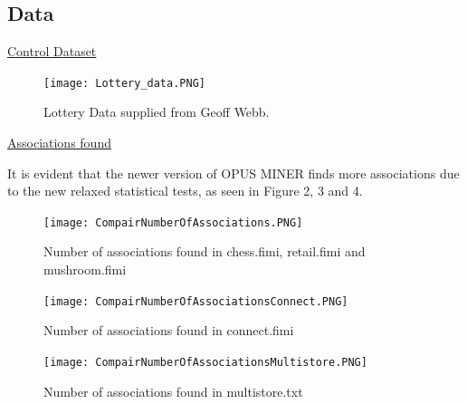 \documentclass[10pt,a4paper]{article}
\begin{document}
\subsection{Data}

\vspace{0.5cm}

\underline{Control Dataset}
\vspace{0.3cm}


\begin{figure}[h!]
\begin{center}
  \texttt{[image: Lottery\_data.PNG]}
\end{center}
  \caption{Lottery Data supplied from Geoff Webb.}
  \label{fig:SSPresults1}
\end{figure}



\pagebreak

\vspace{2cm}
\underline{Associations found}
\vspace{0.3cm}
\begin{addmargin}[3em]{1em}
It is evident that the newer version of OPUS MINER finds more associations due to the new relaxed statistical tests, as seen in Figure 2, 3 and 4.
\end{addmargin}

\vspace{1cm}

\begin{figure}[h!]
\begin{center}
  \texttt{[image: CompairNumberOfAssociations.PNG]}
\end{center}
  \caption{Number of associations found in chess.fimi, retail.fimi and mushroom.fimi}
  \label{fig:SSPresults1}
\end{figure}

\vspace{2cm}

\begin{figure}[h!]
\begin{center}
  \texttt{[image: CompairNumberOfAssociationsConnect.PNG]}
\end{center}
  \caption{Number of associations found in connect.fimi}
  \label{fig:SSPresults1}
\end{figure}

\vspace{2cm}

\begin{figure}[h!]
\begin{center}
  \texttt{[image: CompairNumberOfAssociationsMultistore.PNG]}
\end{center}
  \caption{Number of associations found in multistore.txt}
  \label{fig:SSPresults1}
\end{figure}
\end{document}
